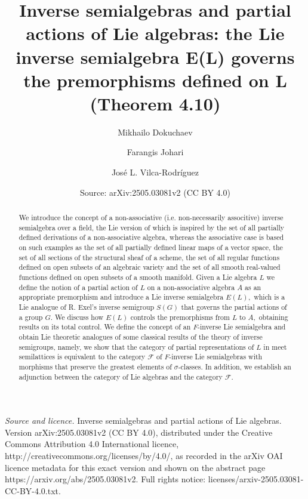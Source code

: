 \documentclass[10pt,a4paper]{amsart}
\title[Inverse semialgebras and partial actions of Lie algebras]{Inverse semialgebras and partial actions of Lie algebras: the Lie inverse semialgebra E(L) governs the premorphisms defined on L (Theorem 4.10)}
\author{Mikhailo Dokuchaev}
\author{Farangis Johari}
\author{ Jos\'e L. Vilca-Rodríguez}
\date{Source: arXiv:2505.03081v2 (CC BY 4.0)}
\theoremstyle{definition}
\theoremstyle{remark}
\numberwithin{equation}{section}
\newtheorem*{Theorem A}{\textbf{Theorem A}}
\newtheorem*{Corollary E}{\textbf{Corollary E}}
\newtheorem*{Corollary F}{\textbf{Corollary F}}
\newtheorem*{Theorem B}{\textbf{Theorem B}}
\newtheorem*{Theorem C}{\textbf{Theorem C}}
\newtheorem*{Theorem D}{\textbf{Theorem B}}
\newtheorem*{p a}{\textbf{Proof of  Theorem A}}
\newtheorem*{p b}{\textbf{Proof of Theorem B}}
\newtheorem*{p c}{\textbf{Proof of  Theorem C}}
\newtheorem*{p d}{\textbf{Proof of  Theorem D}}
\newcommand{\0}{{\vartheta}}
\begin{document}
\begin{abstract} We introduce the concept of a non-associative (i.e. non-necessarily associtive) inverse semialgebra over a field,
the Lie version of which is inspired by the set of all partially defined derivations of a non-associative  algebra, whereas the associative case is based  on such examples as the set of all partially defined linear maps of a vector space, the   set  of all sections of the structural sheaf  of a scheme,  the  set  of all regular functions  defined on open subsets of an algebraic variety and   the set of all smooth real-valued functions defined on open subsets of a smooth manifold. Given a Lie algebra $L$ we define the notion of a partial action of $L$ on a non-associative algebra $A$ as an appropriate premorphism and introduce a  Lie inverse semialgebra $E(L),$ which is a Lie analogue of R. Exel's inverse semigroup $S(G)$ that governs the partial actions of a group $G.$ We  discuss how $E(L)$ controls the premorphisms from $L$ to $A,$ obtaining results on its total control. We define the concept of an $F$-inverse Lie semialgebra and obtain Lie theoretic analogues of some classical results of the theory of inverse semigroups, namely, we show that the category of partial representations of $L$ in  meet semilattices is equivalent to the category   ${\mathcal F}$ of $F$-inverse Lie semialgebras with morphisms that preserve the greatest elements of $\sigma$-classes. In addition,   we establish an adjunction between the category of Lie algebras and the category ${\mathcal F}.$ 


 









 \end{abstract}
\maketitle
\noindent\emph{Source and licence.} Inverse semialgebras and partial actions of Lie algebras. Version arXiv:2505.03081v2 (CC BY 4.0), distributed under the Creative Commons Attribution 4.0 International licence, http://creativecommons.org/licenses/by/4.0/, as recorded in the arXiv OAI licence metadata for this exact version and shown on the abstract page https://arxiv.org/abs/2505.03081v2. Full rights notice: licenses/arxiv-2505.03081-CC-BY-4.0.txt.\par\smallskip
\end{document}
